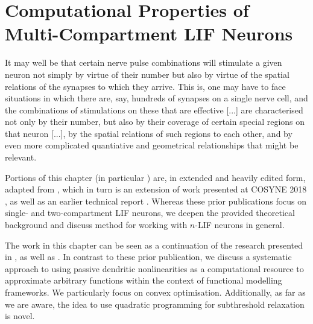 \chapter{Computational Properties of Multi-Compartment LIF Neurons}
\label{chp:nlif}

\vspace{30pt}

\begin{OpeningQuote}
It may well be that certain nerve pulse combinations will stimulate a given neuron not simply by virtue of their number but also by virtue of the spatial relations of the synapses to which they arrive. This is, one may have to face situations in which there are, say, hundreds of synapses on a single nerve cell, and the combinations of stimulations on these that are effective [...] are characterised not only by their number, but also by their coverage of certain special regions on that neuron [...], by the spatial relations of such regions to each other, and by even more complicated quantiative and geometrical relationships that might be relevant.
\end{OpeningQuote}

\vspace{10pt}

\begin{PriorPublication}
Portions of this chapter (in particular ) are, in extended and heavily edited form, adapted from \citet{stoeckel2021}, which in turn is an extension of work presented at COSYNE 2018 \citep{stockel2018nonlinear}, as well as an earlier technical report \citep{stockel2017point}.
Whereas these prior publications focus on single- and two-compartment LIF neurons, we deepen the provided theoretical background and discuss method for working with $n$-LIF neurons in general.
\end{PriorPublication}

\begin{Contributions}
The work in this chapter can be seen as a continuation of the research presented in \citet[Chapter~5]{koch1999biophysics}, as well as \citet[Chapter~4]{tripp2009search}.
In contrast to these prior publication, we discuss a systematic approach to using passive dendritic nonlinearities as a computational resource to approximate arbitrary functions within the context of functional modelling frameworks.
We particularly focus on convex optimisation.
Additionally, as far as we are aware, the idea to use quadratic programming for subthreshold relaxation is novel.
\end{Contributions}

